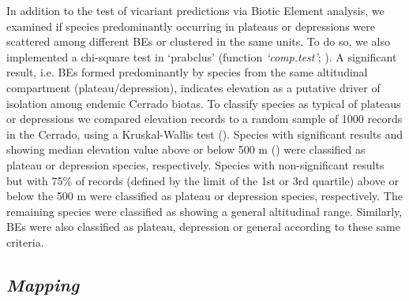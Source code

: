 \documentclass[12pt,openright,oneside,a4paper,english]{abntex2}
\begin{document}
In addition to the test of vicariant predictions via Biotic Element analysis, we examined if species predominantly occurring in plateaus or depressions were scattered among different BEs or clustered in the same units. To do so, we also implemented a chi-square test in ‘prabclus’ (function \textit{‘comp.test’}; \citealp[][]{Hennig2020}). A significant result, i.e. BEs formed predominantly by species from the same altitudinal compartment (plateau/depression), indicates elevation as a putative driver of isolation among endemic Cerrado biotas. To classify species as typical of plateaus or depressions we compared elevation records to a random sample of 1000 records in the Cerrado, using a Kruskal-Wallis test (\citealp[see][for similar analyses]{Nogueira2011}). Species with significant results and showing median elevation value above or below 500 m (\citealp[see][]{Silva1997}) were classified as plateau or depression species, respectively. Species with non-significant results but with 75\% of records (defined by the limit of the 1st or 3rd quartile) above or below the 500 m were classified as plateau or depression species, respectively. The remaining species were classified as showing a general altitudinal range. Similarly, BEs were also classified as plateau, depression or general according to these same criteria.

\subsection{\textit{Mapping}}
\end{document}
